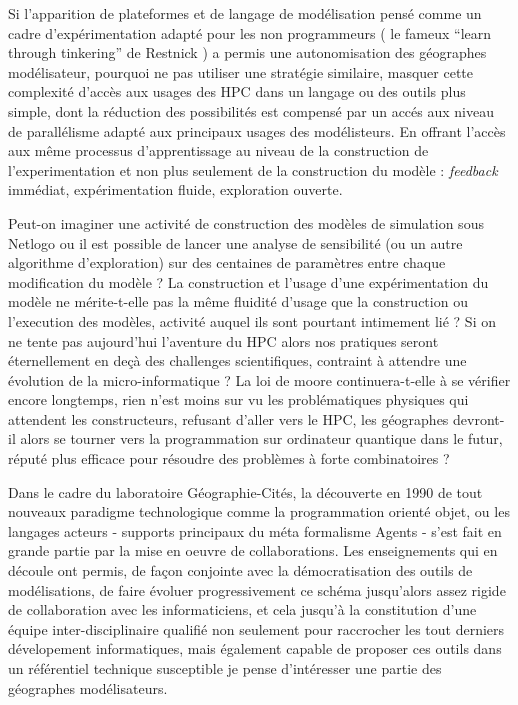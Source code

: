 Si l'apparition de plateformes et de langage de modélisation pensé comme un cadre d'expérimentation adapté pour les non programmeurs ( le fameux \foreignquote{english}{learn through tinkering} de Restnick ) a permis une autonomisation des géographes modélisateur, pourquoi ne pas utiliser une stratégie similaire, masquer cette complexité d'accès aux usages des HPC dans un langage ou des outils plus simple, dont la réduction des possibilités est compensé par un accés aux niveau de parallélisme adapté aux principaux usages des modélisteurs. En offrant l'accès aux même processus d'apprentissage au niveau de la construction de l'experimentation et non plus seulement de la construction du modèle : \textit{feedback} immédiat, expérimentation fluide, exploration ouverte.

Peut-on imaginer une activité de construction des modèles de simulation sous Netlogo ou il est possible de lancer une analyse de sensibilité (ou un autre algorithme d'exploration) sur des centaines de paramètres entre chaque modification du modèle ? La construction et l'usage d'une expérimentation du modèle ne mérite-t-elle pas la même fluidité d'usage que la construction ou l'execution des modèles, activité auquel ils sont pourtant intimement lié ? Si on ne tente pas aujourd'hui l'aventure du HPC alors nos pratiques seront éternellement en deçà des challenges scientifiques, contraint à attendre une évolution de la micro-informatique ? La loi de moore continuera-t-elle à se vérifier encore longtemps, rien n'est moins sur vu les problématiques physiques qui attendent les constructeurs, refusant d'aller vers le HPC, les géographes devront-il alors se tourner vers la programmation sur ordinateur quantique dans le futur, réputé plus efficace pour résoudre des problèmes à forte combinatoires ?

Dans le cadre du laboratoire Géographie-Cités, la découverte en 1990 de tout nouveaux paradigme technologique comme la programmation orienté objet, ou les langages acteurs - supports principaux du méta formalisme Agents - s'est fait en grande partie par la mise en oeuvre de collaborations. Les enseignements qui en découle ont permis, de façon conjointe avec la démocratisation des outils de modélisations, de faire évoluer progressivement ce schéma jusqu'alors assez rigide de collaboration avec les informaticiens, et cela jusqu’à la constitution d’une équipe inter-disciplinaire qualifié non seulement pour raccrocher les tout derniers dévelopement informatiques, mais également capable de proposer ces outils dans un référentiel technique susceptible je pense d'intéresser une partie des géographes modélisateurs.

